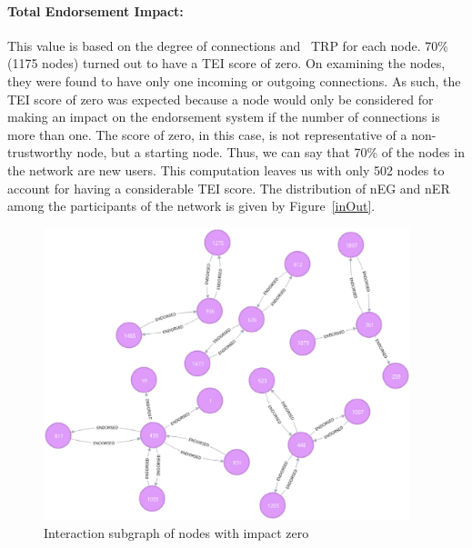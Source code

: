 \paragraph{Total Endorsement Impact:} \label{par:TEI}This value is based on the
degree of connections and ~\ac{TRP} for each node. 70\% (1175 nodes) turned out
to have a \ac{TEI} score of zero. On examining the nodes, they were found to
have only one incoming or outgoing connections. As such, the \ac{TEI} score of
zero was expected because a node would only be considered for making an impact
on the endorsement system if the number of connections is more than one. The
score of zero, in this case, is not representative of a non-trustworthy node,
but a starting node. Thus, we can say that 70\% of the nodes in the network are
new users. This computation leaves us with only 502 nodes to account for having
a considerable \ac{TEI} score. The distribution of \ac{nEG} and \ac{nER} among
the participants of the network is given by Figure~\ref{inOut}. 
\begin{figure}
	\includegraphics[width=0.95\textwidth]{Images/nodesWithImpactZero.eps}
	\caption{Interaction subgraph of nodes with impact zero}
	\label{fig:zeroimpact}
\end{figure}
